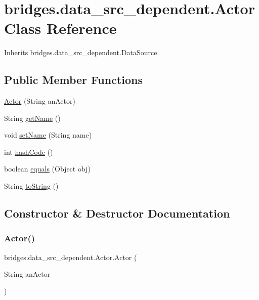 \hypertarget{classbridges_1_1data__src__dependent_1_1_actor}{}\section{bridges.\+data\+\_\+src\+\_\+dependent.\+Actor Class Reference}
\label{classbridges_1_1data__src__dependent_1_1_actor}


Inherits bridges.\+data\+\_\+src\+\_\+dependent.\+Data\+Source.

\subsection*{Public Member Functions}
\begin{DoxyCompactItemize}
\item 
\mbox{\hyperlink{classbridges_1_1data__src__dependent_1_1_actor_a9428c232e44759d118684d6633ca1ec1}{Actor}} (String an\+Actor)
\item 
String \mbox{\hyperlink{classbridges_1_1data__src__dependent_1_1_actor_afb8bf68eb6f0daa3818dc6045371f6e6}{get\+Name}} ()
\item 
void \mbox{\hyperlink{classbridges_1_1data__src__dependent_1_1_actor_a8a3650b446402d511bb4fe99827ff90a}{set\+Name}} (String name)
\item 
int \mbox{\hyperlink{classbridges_1_1data__src__dependent_1_1_actor_a78e29e54c8a200ddbcbae2e0eb323722}{hash\+Code}} ()
\item 
boolean \mbox{\hyperlink{classbridges_1_1data__src__dependent_1_1_actor_a54aeeaad51e062a6fdbfd8d06d486e56}{equals}} (Object obj)
\item 
String \mbox{\hyperlink{classbridges_1_1data__src__dependent_1_1_actor_a5210a5b38a4a311b92e7332aeddb65ff}{to\+String}} ()
\end{DoxyCompactItemize}


\subsection{Constructor \& Destructor Documentation}
\mbox{\label{classbridges_1_1data__src__dependent_1_1_actor_a9428c232e44759d118684d6633ca1ec1}} 
\subsubsection{\texorpdfstring{Actor()}{Actor()}}
{\footnotesize\ttfamily bridges.\+data\+\_\+src\+\_\+dependent.\+Actor.\+Actor (\begin{DoxyParamCaption}\item[{String}]{an\+Actor }\end{DoxyParamCaption})}

